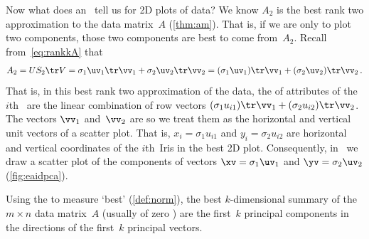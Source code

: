 Now what does an \svd\ tell us for 2D plots of data?  
We know \(A_2\) is the best rank two approximation to the data matrix~\(A\) (\cref{thm:am}). 
That is, if we are only to plot two components, those two components are best to come from~\(A_2\).
Recall from~\eqref{eq:rankkA} that
\begin{equation*}
A_2=US_2\tr V =\sigma_1\uv_1\tr\vv_1 +\sigma_2\uv_2\tr\vv_2
=(\sigma_1\uv_1)\tr\vv_1 +(\sigma_2\uv_2)\tr\vv_2\,.
\end{equation*}
That is, in this best rank two approximation of the data, the  of attributes of the \(i\)th~ are the linear combination of row vectors \((\sigma_1u_{i1})\tr\vv_1+(\sigma_2u_{i2})\tr\vv_2\).
The vectors \(\vv_1\) and~\(\vv_2\) are  so we treat them as the horizontal and vertical unit vectors of a scatter plot. 
That is, \(x_i=\sigma_1u_{i1}\) and \(y_i=\sigma_2u_{i2}\) are horizontal and vertical coordinates of the \(i\)th~Iris in the best 2D plot.
Consequently, in \script\ we draw a scatter plot of the components of vectors \(\xv=\sigma_1\uv_1\) and \(\yv=\sigma_2\uv_2\) (\cref{fig:eaidpca}).


\begin{theorem} \label{thm:pc}
Using the  to measure `best' (\cref{def:norm}), the best \(k\)-dimensional summary of the \(m\times n\) data matrix~\(A\)  (usually of zero ) are the first~\(k\) principal components in the directions of the first~\(k\) principal vectors.
\end{theorem}

